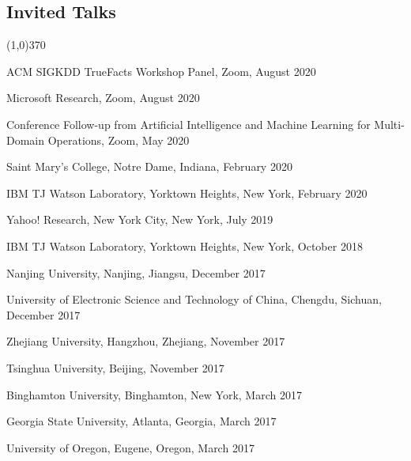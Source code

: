 \documentclass[10pt]{article}
\newenvironment{myindentpar}[1]%
{\begin{list}{}%
         {\setlength{\leftmargin}{#1}}%
         \item[]%
}
{\end{list}}
\newcounter{list}
\begin{document}
\subsection{\sc Invited Talks}
\vspace{-0.4cm} \line(1,0){370} \vspace{-0.1cm}

\begin{myindentpar}{0.75cm}

\hspace{-0.75cm} ACM SIGKDD TrueFacts Workshop Panel, Zoom, August 2020
	
\hspace{-0.75cm} Microsoft Research, Zoom, August 2020
	
\hspace{-0.75cm} Conference Follow-up from Artificial Intelligence and Machine Learning for Multi-Domain Operations, Zoom, May 2020
	
\hspace{-0.75cm} Saint Mary's College, Notre Dame, Indiana, February 2020
	
\hspace{-0.75cm} IBM TJ Watson Laboratory, Yorktown Heights, New York, February 2020
	
\hspace{-0.75cm} Yahoo! Research, New York City, New York, July 2019

\hspace{-0.75cm} IBM TJ Watson Laboratory, Yorktown Heights, New York, October 2018
	
\hspace{-0.75cm} Nanjing University, Nanjing, Jiangsu, December 2017

\hspace{-0.75cm} University of Electronic Science and Technology of China, Chengdu, Sichuan, December 2017

\hspace{-0.75cm} Zhejiang University, Hangzhou, Zhejiang, November 2017

\hspace{-0.75cm} Tsinghua University, Beijing, November 2017

\hspace{-0.75cm} Binghamton University, Binghamton, New York, March 2017

\hspace{-0.75cm} Georgia State University, Atlanta, Georgia, March 2017

\hspace{-0.75cm} University of Oregon, Eugene, Oregon, March 2017


\end{myindentpar}
\end{document}
